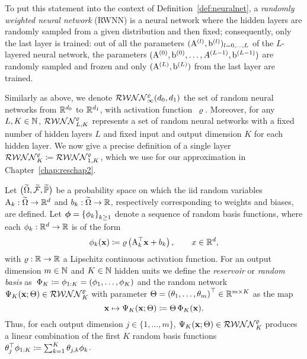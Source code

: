To put this statement into the context of Definition~\ref{def:neuralnet}, a \textit{randomly weighted neural network} (RWNN) is a neural network where the hidden layers are randomly sampled from a given distribution and then fixed; consequently, only the last layer is trained:
out of all the parameters $(\mathrm{A}^{(l)}, \mathrm{b}^{(l)})_{l=0,\ldots,L}$ of the $L$-layered neural network, the parameters $(\mathrm{A}^{(0)}, \mathrm{b}^{(0)}, \ldots, A^{(L-1)}, \mathrm{b}^{(L-1)})$ are randomly sampled and frozen and only $(\mathrm{A}^{(L)}, \mathrm{b}^{(L)})$ from the last layer are trained. 

Similarly as above, we denote $\mathcal{RWNN}_{\infty}^{\varrho}(d_0,d_1)$ the set of random neural networks from $\mathbb{R}^{d_0}$ to $\mathbb{R}^{d_1}$, with activation function~$\varrho$. %
Moreover, for any $L, K \in \mathbb{N}$, $\mathcal{RWNN}_{L, K}^\varrho$ represents a set of random neural networks with a fixed number of hidden layers $L$ and fixed input and output dimension $K$ for each hidden layer. 
We now give a precise definition of a single layer $\mathcal{RWNN}^\varrho_{K}\coloneqq\mathcal{RWNN}^\varrho_{1, K}$, which we use for our approximation in Chapter~\ref{chap:reschap2}.

\begin{definition}\label{def:RWNN}
Let $\big(\widetilde{\Omega}, \widetilde{\mathcal{F}}, \widetilde{\mathbb{P}}\big)$ be a probability space on which the iid random variables $\mathrm{A}_{k}: \widetilde{\Omega} \rightarrow \mathbb{R}^{d}$ and $b_{k}: \widetilde{\Omega} \rightarrow \mathbb{R}$, respectively corresponding to weights and biases, are defined. Let $\boldsymbol{\phi}=\left\{\phi_{k}\right\}_{k \geq 1}$ denote a sequence of random basis functions, where each $\phi_{k}: \mathbb{R}^{d} \to\mathbb{R}$ is of the form
$$
\phi_{k}(\boldsymbol{\mathrm{x}})\coloneqq\varrho\left(\mathrm{A}_{k}^{\top} \boldsymbol{\mathrm{x}} + b_{k}\right), \qquad x\in\mathbb{R}^d,
$$
with $\varrho:\mathbb{R}\rightarrow\mathbb{R}$ a Lipschitz continuous activation function. 
For an output dimension $m\in\mathbb{N}$ and $K \in \mathbb{N}$ hidden units we define the \textit{reservoir} or \textit{random basis} as~$\Phi_{K}\coloneqq\nobreak\phi_{1:K}=(\phi_1,\dots,\phi_K)$ and the random network $\Psi_K(\boldsymbol{\mathrm{x}};\Theta)\in\mathcal{RWNN}^\varrho_K$ with parameter $\Theta=\left(\theta_{1}, \ldots, \theta_{m}\right)^\top \in \mathbb{R}^{m\times K}$ as the map %
\[
\boldsymbol{\mathrm{x}} \mapsto \Psi_K(\boldsymbol{\mathrm{x}};\Theta)\coloneqq\Theta\,\Phi_K(\boldsymbol{\mathrm{x}}).
\]
Thus, for each output dimension $j\in\{1,\dots,m\}$, $\Psi_K(\boldsymbol{\mathrm{x}};\Theta)\in\mathcal{RWNN}^\varrho_K$ produces a linear combination of the first $K$ random basis functions $\theta_j^\top\phi_{1:K}\coloneqq\sum_{k=1}^{K} \theta_{j,k} \phi_{k}$.
\end{definition}

